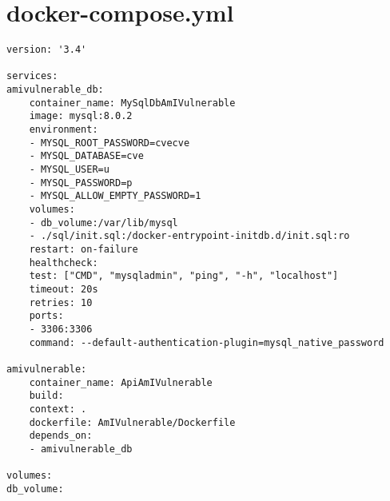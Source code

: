 \section{docker-compose.yml} \label{sec:dockerComposeYml}
    \begin{lstlisting}[style=yaml]
version: '3.4'

services:
amivulnerable_db:
    container_name: MySqlDbAmIVulnerable
    image: mysql:8.0.2
    environment:
    - MYSQL_ROOT_PASSWORD=cvecve
    - MYSQL_DATABASE=cve
    - MYSQL_USER=u
    - MYSQL_PASSWORD=p
    - MYSQL_ALLOW_EMPTY_PASSWORD=1
    volumes:
    - db_volume:/var/lib/mysql
    - ./sql/init.sql:/docker-entrypoint-initdb.d/init.sql:ro
    restart: on-failure
    healthcheck:
    test: ["CMD", "mysqladmin", "ping", "-h", "localhost"]
    timeout: 20s
    retries: 10
    ports:
    - 3306:3306
    command: --default-authentication-plugin=mysql_native_password

amivulnerable:
    container_name: ApiAmIVulnerable
    build:
    context: .
    dockerfile: AmIVulnerable/Dockerfile
    depends_on:
    - amivulnerable_db

volumes:
db_volume:
    \end{lstlisting}
